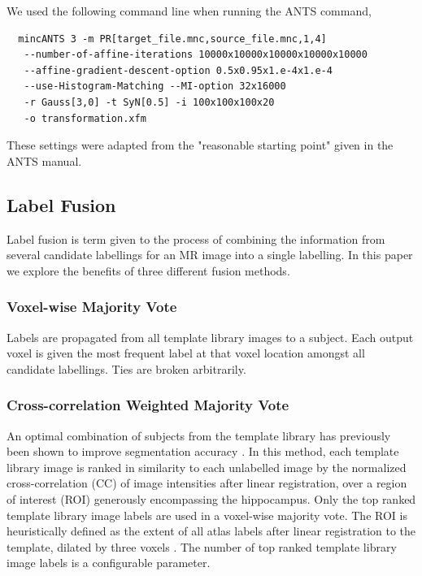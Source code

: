 \documentclass{article}\usepackage{graphicx, color}
\makeatletter
\newenvironment{kframe}{%
 \def\at@end@of@kframe{}%
 \ifinner\ifhmode%
  \def\at@end@of@kframe{\end{minipage}}%
  \begin{minipage}{\columnwidth}%
 \fi\fi%
 \def\FrameCommand##1{\hskip\@totalleftmargin \hskip-\fboxsep
 \colorbox{shadecolor}{##1}\hskip-\fboxsep
     \hskip-\linewidth \hskip-\@totalleftmargin \hskip\columnwidth}%
 \MakeFramed {\advance\hsize-\width
   \@totalleftmargin\z@ \linewidth\hsize
   \@setminipage}}%
 {\par\unskip\endMakeFramed%
 \at@end@of@kframe}
\newcommand{\todo}[1]{\begin{kframe}{\textcolor{red}{TODO #1}}\end{kframe}}
\makeatother
\begin{document}
We used the following command line when running the ANTS command, 
\begin{verbatim}
  mincANTS 3 -m PR[target_file.mnc,source_file.mnc,1,4] 
   --number-of-affine-iterations 10000x10000x10000x10000x10000 
   --affine-gradient-descent-option 0.5x0.95x1.e-4x1.e-4
   --use-Histogram-Matching --MI-option 32x16000
   -r Gauss[3,0] -t SyN[0.5] -i 100x100x100x20
   -o transformation.xfm
 \end{verbatim}
These settings were adapted from the "reasonable starting point" given in the
ANTS manual. \todo{reference manual?}



\subsection{Label Fusion}

Label fusion is term given to the process of combining the information from
several candidate labellings for an MR image into a single labelling.  In this
paper we explore the benefits of three different fusion methods. 

\subsubsection{Voxel-wise Majority Vote}

Labels are propagated from all template library images to a subject.  Each
output voxel is given the most frequent label at that voxel location amongst
all candidate labellings.  Ties are broken arbitrarily.

\subsubsection{Cross-correlation Weighted Majority Vote}

An optimal combination of subjects from the template library has previously been
shown to improve segmentation accuracy \citep{Aljabar2009,Collins2010}.  In this
method, each template library image is ranked in similarity to each unlabelled 
image by the normalized cross-correlation (CC) of image intensities after linear
registration, over a region of interest (ROI) generously encompassing the 
hippocampus.  Only the top ranked
template library image labels are used in a voxel-wise majority vote. The ROI
is heuristically defined as the extent of all atlas labels after linear
registration to the template, dilated by three voxels \citep{Chakravarty2012}.  
The number of top ranked template library image labels is a configurable parameter.
\end{document}
